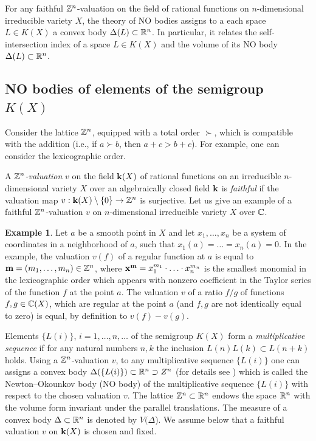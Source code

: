 \documentclass[11pt]{article}
\theoremstyle{plain}
\theoremstyle{definition}
\newtheorem{example}[theorem]{Example}
\begin{document}
For any faithful $\Bbb Z^n$-valuation on the field of rational functions on $n$-dimensional irreducible variety $X$, the theory of NO bodies assigns to a each space $L\in K(X)$  a convex body $\Delta(L)\subset \Bbb R^n$. In particular, it relates  the self-intersection index of a space  $L\in K(X)$ and the volume of its NO body $\Delta(L)\subset \Bbb R^n$.


\subsection{NO bodies of elements of the semigroup $K(X)$}

Consider the lattice  $\Bbb Z^n$, equipped with a total order $\succ$, which  is compatible with the addition (i.e., if $a\succ b$, then $a+c>b+c$). For example, one can consider the  lexicographic  order.


 A {\it  $\Bbb Z^n$-valuation} $v$ on the field  $\bold k(X)$  of rational functions on an irreducible $n$-dimensional variety $X$ over an algebraically closed field $\bold k$  is {\it faithful} if the valuation map
$v:\bold k(X)\setminus \{0\} \to \Bbb Z^n$ is  surjective. Let us give an example of a faithful $\Bbb Z^n$-valuation $v$
on $n$-dimensional irreducible  variety $X$ over $\Bbb C$.

\begin{example}\label{exval}  Let $a$ be a smooth point in $X$ and let $x_1,\dots, x_n$ be a  system of coordinates in a neighborhood of $a$, such that $x_1(a)=\dots=x_n(a)=0$. In the example, the valuation   $v(f)$  of a  regular function  at $a$   is equal to $\bold m =(m_1,\dots, m_n)\in \Bbb Z^n$, where $\bold x^\bold m= x_1^{m_1}\cdot \ldots \cdot x_n^{m_n}$
is the smallest  monomial  in the  lexicographic order which appears with nonzero coefficient in the Taylor series of the function  $f$ at the point $a$. The valuation $v$ of a ratio $f/g$  of  functions $f,g\in \Bbb C(X)$, which are regular at the point  $a$ (and $f,g$ are  not identically equal to  zero) is equal, by  definition to $v(f)-v(g)$.
\end{example}

 Elements $\{L(i)\}$,  $i=1,\dots,n,\dots$  of the semigroup  $K(X)$ form  a {\it multiplicative sequence} if for any natural numbers $n, k$ the inclusion $L(n) L(k)\subset L(n+k)$ holds. Using a  $\Bbb Z^n$-valuation $v$, to any multiplicative sequence $\{L(i)\}$ one can  assigns   a convex body $\Delta (\{L(i)\}) \subset  \Bbb R^n \supset Z^n$ (for details see  \cite{K-K12}) which is called  the Newton--Okounkov body (NO body)  of the multiplicative sequence $\{L(i)\}$ with respect to the chosen valuation $v$.
The lattice $\Bbb Z^n\subset \Bbb R^n$  endows the space $\Bbb R^n$ with the volume form invariant under the parallel translations. The measure of a convex body $\Delta \subset \Bbb R^n$ is denoted by $V(\Delta $).
 We assume  below   that a faithful valuation $v$ on $\bold k (X)$ is chosen and fixed.
\end{document}
